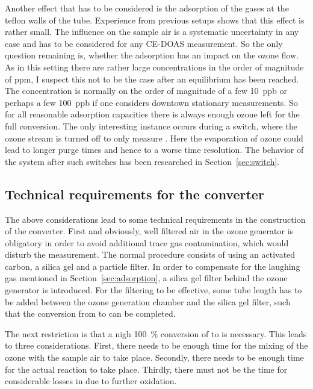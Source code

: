 Another effect that has to be considered is the adsorption of the
gases at the teflon walls of the tube. Experience from previous setups
shows that this effect is rather small. The influence on the sample
air is a systematic uncertainty in any case and has to be considered
for any CE-DOAS measurement. So the only question remaining is,
whether the adsorption has an impact on the ozone flow. As in this
setting there are rather large concentrations in the order of
magnitude of \si{ppm}, I suspect this not to be the case after an
equilibrium has been reached. The  concentration is normally on
the order of magnitude of a few \SI{10}{ppb} or perhaps a few
\SI{100}{ppb} if one considers downtown stationary measurements. So
for all reasonable adsorption capacities there is always enough ozone
left for the full conversion. The only interesting instance occurs
during a switch, where the ozone stream is turned off to only measure
. Here the evaporation of ozone could lead to longer purge
times and hence to a worse time resolution. The behavior of the
system after such switches has been researched in
Section~\ref{sec:switch}.

\subsection{Technical requirements for the converter}
\label{sec:requirements}

The above considerations lead to some technical requirements in the
construction of the converter. First and obviously, well filtered air
in the ozone generator is obligatory in order to avoid additional
trace gas contamination, which would disturb the measurement. The
normal procedure consists of using an activated carbon, a silica gel
and a particle filter. In order to compensate for the laughing gas mentioned in
Section~\ref{sec:adsorption}, a silica gel filter behind the ozone
generator is introduced. For the filtering to be effective, some tube
length has to be added between the ozone generation chamber and the
silica gel filter, such that the conversion from  to 
can be completed.

The next restriction is that a nigh \SI{100}{\%} conversion of 
to  is necessary. This leads to three considerations. First,
there needs to be enough time for the mixing of the ozone with the
sample air to take place. Secondly, there needs to be enough time for
the actual reaction to take place. Thirdly, there must not be the time 
for considerable losses in  due to further oxidation.

